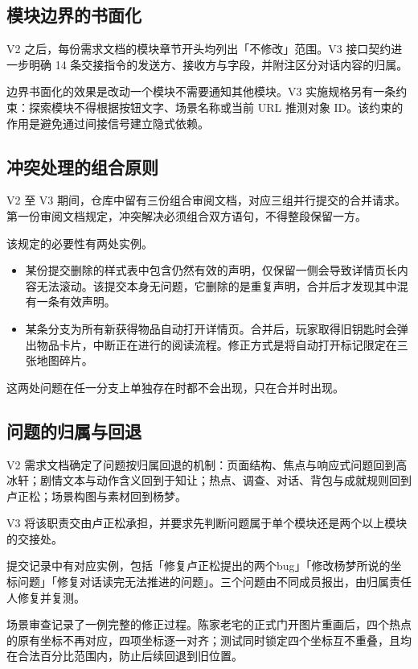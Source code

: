 \subsection{模块边界的书面化}

V2 之后，每份需求文档的模块章节开头均列出「不修改」范围。V3 接口契约进一步明确 14 条交接指令的发送方、接收方与字段，并附注区分对话内容的归属。

边界书面化的效果是改动一个模块不需要通知其他模块。V3 实施规格另有一条约束：探索模块不得根据按钮文字、场景名称或当前 URL 推测对象 ID。该约束的作用是避免通过间接信号建立隐式依赖。

\subsection{冲突处理的组合原则}

V2 至 V3 期间，仓库中留有三份组合审阅文档，对应三组并行提交的合并请求。第一份审阅文档规定，冲突解决必须组合双方语句，不得整段保留一方。

该规定的必要性有两处实例。

\begin{itemize}
  \item 某份提交删除的样式表中包含仍然有效的声明，仅保留一侧会导致详情页长内容无法滚动。该提交本身无问题，它删除的是重复声明，合并后才发现其中混有一条有效声明。
  \item 某条分支为所有新获得物品自动打开详情页。合并后，玩家取得旧钥匙时会弹出物品卡片，中断正在进行的阅读流程。修正方式是将自动打开标记限定在三张地图碎片。
\end{itemize}

这两处问题在任一分支上单独存在时都不会出现，只在合并时出现。

\subsection{问题的归属与回退}

V2 需求文档确定了问题按归属回退的机制：页面结构、焦点与响应式问题回到高冰轩；剧情文本与动作含义回到于知让；热点、调查、对话、背包与成就规则回到卢正松；场景构图与素材回到杨梦。

V3 将该职责交由卢正松承担，并要求先判断问题属于单个模块还是两个以上模块的交接处。

提交记录中有对应实例，包括「修复卢正松提出的两个bug」「修改杨梦所说的坐标问题」「修复对话读完无法推进的问题」。三个问题由不同成员报出，由归属责任人修复并复测。

场景审查记录了一例完整的修正过程。陈家老宅的正式门开图片重画后，四个热点的原有坐标不再对应，四项坐标逐一对齐；测试同时锁定四个坐标互不重叠，且均在合法百分比范围内，防止后续回退到旧位置。

